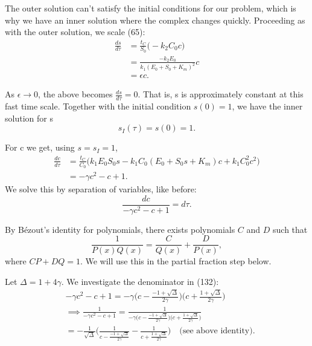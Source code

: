 \documentclass[12pt]{article}
\begin{document}
The outer solution can't satisfy the initial conditions for our
problem, which is why we have an inner solution where the complex
changes quickly. Proceeding as with the outer solution, we scale (65):
\begin{align}
\frac{ds}{d\tau} &= \frac{t_C}{S_0} \Big( - k_2 C_0 c \Big) \\
                 &= \frac{-k_2 E_0}{k_1(E_0 + S_0 + K_m)^2} c \\
                 &= \epsilon c.
\end{align}

As $\epsilon \to 0$, the above becomes $\frac{ds}{d\tau} = 0$. That
is, s is approximately constant at this fast time scale. Together with
the initial condition $s(0)=1$, we have the inner solution for s
\begin{equation}
s_I(\tau) = s(0) = 1.
\end{equation}

For c we get, using $s= s_I = 1$,
\begin{align}
\frac{dc}{d\tau} &= \frac{t_C}{C_0} \Big(
                     k_1 E_0 S_0 s - k_1 C_0 (E_0 + S_0 s + K_m) c + k_1 C_0^2 c^2
                     \Big) \\
                 & = - \gamma c^2 - c + 1.
\end{align}
We solve this by separation of variables, like before:
\begin{equation}
\frac{dc}{- \gamma c^2 - c + 1} = d\tau.
\end{equation}

By B\'{e}zout's identity for polynomials, there exists polynomials $C$
and $D$ such that
\begin{equation}
\frac{1}{P(x) Q(x)} = \frac{C}{Q(x)} + \frac{D}{P(x)},
\end{equation}
where $CP+DQ = 1$. We will use this in the partial fraction step below.

Let $\Delta=1 + 4\gamma$. We investigate the denominator in (132):
\begin{align}
&-\gamma c^2 - c + 1 = - \gamma
                        \Big(c - \frac{-1 + \sqrt{\Delta}}{2 \gamma}\Big)
                        \Big(c + \frac{ 1 + \sqrt{\Delta}}{2 \gamma}\Big) \\
&\implies \frac{1}{- \gamma c^2 - c + 1} = \frac{1}
                        {- \gamma
                        \Big(c - \frac{-1 + \sqrt{\Delta}}{2 \gamma}\Big)
                        \Big(c + \frac{ 1 + \sqrt{\Delta}}{2 \gamma}\Big)} \\
&= - \frac{1}{\sqrt{\Delta}}
   \Bigg(\frac{1}{c - \frac{-1 + \sqrt{\Delta}}{2 \gamma}} -
        \frac{1}{c + \frac{1 + \sqrt{\Delta}}{2 \gamma}} \Bigg)
   \quad \text{(see above identity)}.
\end{align}
\end{document}
